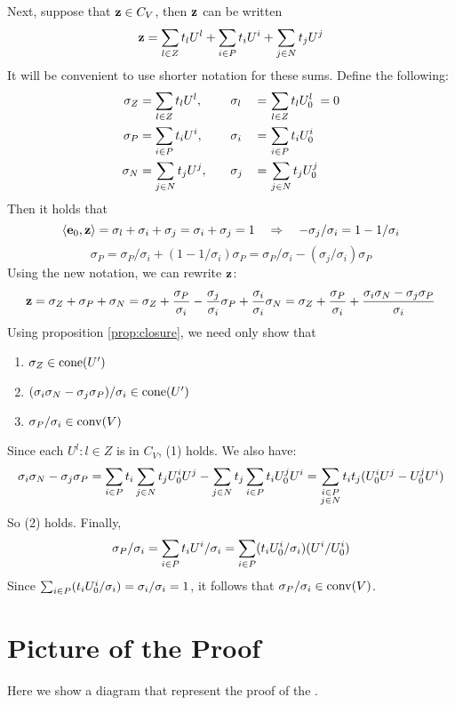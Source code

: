 Next, suppose that $\mathbf{z} \in C_V$, then $\mathbf{z}$ can be written
\[ \mathbf{z} = \sum_{l\in Z} t_l U^l + \sum_{i\in P} t_i U^i + \sum_{j\in N} t_j U^j \]
It will be convenient to use shorter notation for these sums.  Define the following:
\begin{alignat*}{3}
  \sigma_Z &= \sum_{l\in Z} t_l U^l, \quad &&\sigma_l \,&=&\, \sum_{l\in Z} t_l U^l_{0} \;= 0\\
  \sigma_P &= \sum_{i\in P} t_i U^i, \quad &&\sigma_i \,&=&\, \sum_{i\in P} t_i U^i_{0} \\
  \sigma_N &= \sum_{j\in N} t_j U^j, \quad &&\sigma_j \,&=&\, \sum_{j\in N} t_j U^j_{0}
\end{alignat*}
Then it holds that
\[ \left\langle \mathbf{e}_0, \mathbf{z} \right\rangle = \sigma_l + \sigma_i + \sigma_j = \sigma_i + \sigma_j = 1 
      \quad\Rightarrow\quad -\sigma_j/\sigma_i = 1 - 1/\sigma_i \]
\[ \sigma_P = \sigma_P/\sigma_i + (1-1/\sigma_i)\sigma_P 
            = \sigma_P/\sigma_i - (\sigma_j/\sigma_i)\sigma_P \]
Using the new notation, we can rewrite $\mathbf{z}$:
\[ \mathbf{z} = \sigma_Z + \sigma_P + \sigma_N 
      = \sigma_Z + \frac{\sigma_P}{\sigma_i} - \frac{\sigma_j}{\sigma_i}\sigma_P
                 + \frac{\sigma_i}{\sigma_i}\sigma_N 
      = \sigma_Z + \frac{\sigma_P}{\sigma_i} + 
                   \frac{\sigma_i\sigma_N - \sigma_j\sigma_P}{\sigma_i}
\]
Using proposition \ref{prop:closure}, we need only show that 
\begin{enumerate}
  \item $\sigma_Z \in \operatorname{cone}(U')$
  \item $(\sigma_i\sigma_N - \sigma_j\sigma_P)/\sigma_i \in \operatorname{cone}(U')$ 
  \item $\sigma_P/\sigma_i \in \operatorname{conv}(V)$
\end{enumerate}
Since each $U^l : l \in Z$ is in $C_V$, (1) holds.  We also have:
\[ \sigma_i\sigma_N - \sigma_j\sigma_P = 
    \sum_{i\in P} t_i \sum_{j\in N} t_j U^i_{0} U^j - \sum_{j\in N} t_j \sum_{i\in P} t_i U^j_{0} U^i = 
    \sum_{\substack{i\in P \\ j\in N}} t_i t_j(U^i_{0} U^j - U^j_{0} U^i) \]
So (2) holds.  Finally,
\[ \sigma_P/\sigma_i = \sum_{i\in P} t_i U^i / \sigma_i = \sum_{i\in P} (t_i U^i_{0}/\sigma_i)(U^i/U^i_{0}) \]
Since $\sum_{i\in P} (t_i U^i_{0}/\sigma_i) = \sigma_i / \sigma_i = 1$, it follows that $\sigma_P / \sigma_i \in \operatorname{conv}(V)$.

\section{Picture of the Proof}
Here we show a diagram that represent the proof of the {\MWT}.

